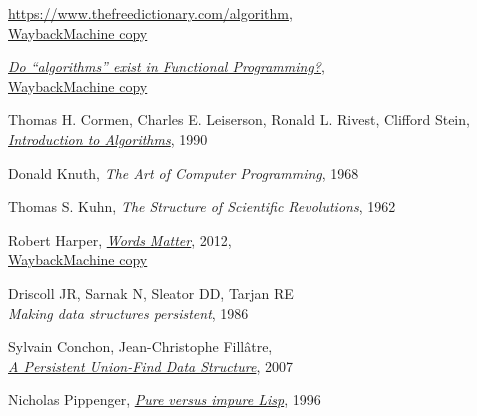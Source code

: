 \documentclass[declaration,mgr,english,shortabstract]{iithesis}
\begin{document}


\newcommand{\wayback}[1]{\href{#1}{WaybackMachine copy}}

\begin{thebibliography}{1}

    \url{https://www.thefreedictionary.com/algorithm}, \\
    \wayback{https://web.archive.org/web/20210320000535/https://www.thefreedictionary.com/algorithm}

    \href{https://stackoverflow.com/questions/25940327/do-algorithms-exist-in-functional-programming}{\textit{Do ``algorithms'' exist in Functional Programming?}}, \\
    \wayback{https://web.archive.org/web/20210320000834/https://stackoverflow.com/questions/25940327/do-algorithms-exist-in-functional-programming}

    Thomas H. Cormen, Charles E. Leiserson, Ronald L. Rivest, Clifford Stein, \\
    \href{http://ressources.unisciel.fr/algoprog/s00aaroot/aa00module1/res/%5BCormen-AL2011%5DIntroduction_To_Algorithms-A3.pdf}{\textit{Introduction to Algorithms}},
    1990

    Donald Knuth,
    \textit{The Art of Computer Programming},
    1968

    Thomas S. Kuhn,
    \textit{The Structure of Scientific Revolutions},
    1962

    Robert Harper,
    \href{https://existentialtype.wordpress.com/2012/02/01/words-matter/}{\textit{Words Matter}},
    2012, \\
    \wayback{https://web.archive.org/web/20210320001018/https://existentialtype.wordpress.com/2012/02/01/words-matter/}

    Driscoll JR, Sarnak N, Sleator DD, Tarjan RE \\
    \textit{Making data structures persistent},
    1986

    Sylvain Conchon, Jean-Christophe Fillâtre, \\
    \href{https://www.lri.fr/~filliatr/ftp/publis/puf-wml07.pdf}{\textit{A Persistent Union-Find Data Structure}},
    2007

    Nicholas Pippenger,
    \href{https://www.cs.princeton.edu/courses/archive/fall03/cs528/handouts/Pure%20Versus%20Impure%20LISP.pdf}{\textit{Pure versus impure Lisp}},
    1996


\end{thebibliography}
\end{document}
